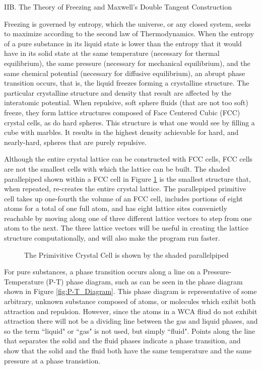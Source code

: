 \documentclass[12pt]{article}
\begin{document}
\[\]
\noindent IIB. The Theory of Freezing and Maxwell's Double Tangent Construction

Freezing is governed by entropy, which the universe, or any closed system, seeks to maximize according to the second law of Thermodynamics. When the entropy of a pure substance in its liquid state is lower than the entropy that it would have in its solid state at the same temperature (necessary for thermal equilibrium), the same pressure (necessary for mechanical equilibrium), and the same chemical potential (necessary for diffusive equilibrium), an abrupt phase transition occurs, that is, the liquid freezes forming a crystalline structure. The particular crystalline structure and density that result are affected by the interatomic potential. When repulsive, soft sphere fluids (that are not too soft) freeze, they form lattice structures composed of Face Centered Cubic (FCC) crystal cells, as do hard spheres. %
This structure is what one would see by filling a cube with marbles. It results in the highest density achievable for hard, and nearly-hard, spheres that are purely repulsive. 

Although the entire crystal lattice can be constructed with FCC cells, FCC cells are not the smallest cells with which the lattice can be built. The shaded parallepiped shown within a FCC cell in Figure \ref{fig:primitivecell_firsttime} is the smallest structure that, when repeated, re-creates the entire crystal lattice. The parallepiped primitive cell takes up one-fourth the volume of an FCC cell, includes portions of eight atoms for a total of one full atom, and has eight lattice sites convenietly reachable by moving along one of three different lattice vectors to step from one atom to the next. The three lattice vectors will be useful in creating the lattice structure computationally, and will also make the program run faster.

  \begin{figure}[h!]
    \centering
    \caption{The Primivitive Crystal Cell is shown by the shaded parallelpiped}
    \label{fig:primitivecell_firsttime}
  \end{figure}

For pure substances, a phase transition occurs along a line on a Pressure-Temperature (P-T) phase diagram, such as can be seen in the phase diagram shown in Figure \ref{fig:P-T_Diagram}. This phase diagram is representative of some arbitrary, unknown substance composed of atoms, or molecules which exibit both attraction and repulsion. However, since the atoms in a WCA fliud do not exhibit attraction there will not be a dividing line between the gas and liquid phases, and so the term ``liquid" or ``gas" is not used, but simply ``fluid". Points along the line that separates the solid and the fluid phases indicate a phase transition, and show that the solid and the fluid both have the same temperature and the same pressure at a phase transistion.
\end{document}
